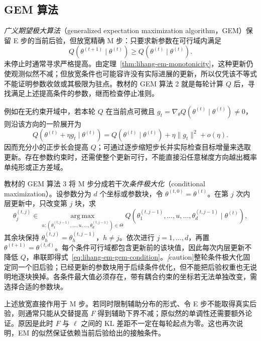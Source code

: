 \subsection{GEM 算法}
\label{subsec:lihang-em-gem}

\emph{广义期望极大算法}（generalized expectation maximization algorithm，GEM）保留 E 步的当前后验，但放宽精确 M 步：只要求新参数在可行域内满足
\begin{equation}
  Q(\theta^{(t+1)}\mid\theta^{(t)})
  \geq Q(\theta^{(t)}\mid\theta^{(t)}).
  \label{eq:lihang-em-gem-condition}
\end{equation}
未停止时通常寻求严格提高。由定理~\ref{thm:lihang-em-monotonicity}，这种更新仍使观测似然不减；但放宽条件也可能容许没有实际进展的更新，所以仅凭该不等式不能证明参数收敛或其极限为驻点。教材的 GEM 算法 2 就是每轮计算 $Q$ 后，寻找满足上述提高条件的参数，继而检查停止准则。

例如在无约束开域中，若本轮 $Q$ 在当前点可微且 $g_t=\nabla_\theta Q(\theta^{(t)}\mid\theta^{(t)})\ne0$，则沿该方向的一阶展开为
\[
  Q(\theta^{(t)}+\eta g_t\mid\theta^{(t)})
  =Q(\theta^{(t)}\mid\theta^{(t)})+\eta\|g_t\|^2+o(\eta).
\]
因而充分小的正步长会提高 $Q$；可通过逐步缩短步长并实际检查目标增量来选取更新。存在参数约束时，还需使整个更新可行，不能直接沿任意梯度方向越出概率单纯形或正方差域。

教材的 GEM 算法 3 将 M 步分成若干次\emph{条件极大化}（conditional maximization）。设参数分为 $d$ 个坐标或参数块，令 $\theta^{(t,0)}=\theta^{(t)}$。在第 $j$ 次内层更新中，只改变第 $j$ 块，求
\begin{equation}
  \theta_j^{(t,j)}\in\operatorname*{arg\,max}_{u:
    (\theta_1^{(t,j-1)},\ldots,u,\ldots,\theta_d^{(t,j-1)})\in\Theta}
  Q(\theta_1^{(t,j-1)},\ldots,u,\ldots,\theta_d^{(t,j-1)}\mid\theta^{(t)}),
  \label{eq:lihang-em-conditional-maximization}
\end{equation}
其余块保持 $\theta_h^{(t,j)}=\theta_h^{(t,j-1)}$，$h\ne j$。依次进行 $j=1,\ldots,d$，再置 $\theta^{(t+1)}=\theta^{(t,d)}$。每个条件可行域都包含更新前的该块值，因此每次内层更新不降低 $Q$，串联即得式~\eqref{eq:lihang-em-gem-condition}。\emph[caution]{整轮条件极大化固定同一个旧后验}；已经更新的参数块用于后续条件优化，但不能把后验权重也无说明地逐块换掉。各条件最大值必须存在，带有耦合约束的坐标若无法单独改变，需选择合适的参数块。

上述放宽直接作用于 M 步。若同时限制辅助分布的形式、令 E 步不能取得真实后验，则通常只能从交替提高 $F$ 得到辅助下界不减；原似然的单调性还需要额外论证。原因是此时 $F$ 与 $\ell$ 之间的 KL 差距不一定在每轮起点为零。这也再次说明，EM 的似然保证依赖当前后验给出的接触条件。

